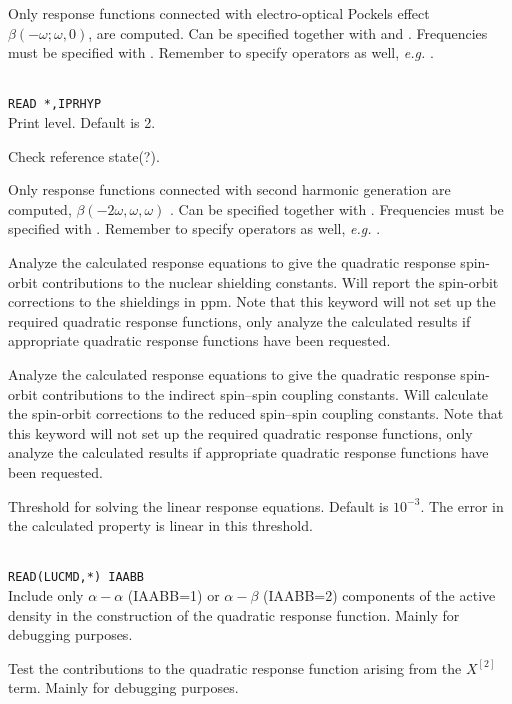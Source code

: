 \begin{description}
\item{}
Only response functions connected with electro-optical
Pockels effect
$\beta(-\omega; \omega,0)$, are computed.
Can be specified together with  and .
Frequencies must be specified with .
Remember to specify operators as well, {\it e.g.\/} .

\item{}\\
\verb|READ *,IPRHYP|\\
Print level. Default is 2.

\item{} Check reference state(?).

\item{}
Only response functions connected with second harmonic
generation
are computed, $\beta(-2\omega,\omega,\omega)$ .
Can be specified together with .
Frequencies must be specified with .
Remember to specify operators as well, {\it e.g.\/} .

\item{}
Analyze the calculated response equations to give the quadratic
response spin-orbit contributions to the nuclear shielding
constants. Will report the spin-orbit corrections to the shieldings in
ppm. Note that this keyword will not set up the required quadratic
response functions, only analyze the calculated results if appropriate
quadratic response functions have been requested.

\item{}
Analyze the calculated response equations to give the quadratic
response spin-orbit contributions to the indirect spin--spin coupling
constants. Will calculate the spin-orbit corrections to the reduced spin--spin
coupling constants. Note that this keyword will not set up the
required quadratic 
response functions, only analyze the calculated results if appropriate
quadratic response functions have been requested.

\item{}
Threshold for solving the linear response equations.
Default is $10^{-3}$. The error in the calculated property is linear
in this threshold.

\item{}\\
\verb|READ(LUCMD,*) IAABB|\\
Include only $\alpha-\alpha$ (IAABB=1) or $\alpha-\beta$ (IAABB=2)
components of the active density in the construction of the quadratic
response function. Mainly for debugging purposes.

\item{}
Test the contributions to the quadratic response function arising from
the $X^{\left[2\right]}$ term. Mainly for debugging purposes.

\end{description}

